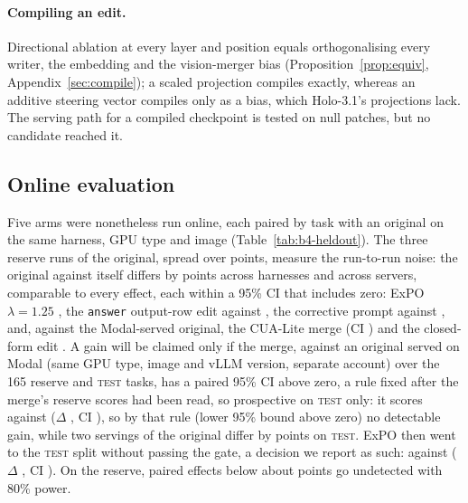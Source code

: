 \paragraph{Compiling an edit.} Directional ablation at every layer and position equals orthogonalising every writer, the embedding and the vision-merger bias (Proposition~\ref{prop:equiv}, Appendix~\ref{sec:compile}); a scaled projection compiles exactly, whereas an additive steering vector compiles only as a bias, which Holo-3.1's projections lack. The serving path for a compiled checkpoint is tested on null patches, but no candidate reached it.

\subsection{Online evaluation}
\label{nsec:online}
Five arms were nonetheless run online, each paired by task with an original on the same harness, GPU type and image (Table~\ref{tab:b4-heldout}). The three reserve runs of the original, spread over \onReserveOrigRange{} points, measure the run-to-run noise: the original against itself differs by \onNoiseDelta{} points across harnesses and \onNoiseServerDelta{} across servers, comparable to every effect, each within a 95\% CI that includes zero: ExPO $\lambda=1.25$ \onReserveExpoDelta, the \texttt{answer} output-row edit \onReserveLmrowArm{} against \onReserveLmrowOrig, the corrective prompt \onReservePromptArm{} against \onReservePromptOrig, and, against the Modal-served original, the CUA-Lite merge \onReserveCuaDelta{} (CI \onReserveCuaCi) and the closed-form edit \onReserveBroadDelta. A gain will be claimed only if the merge, against an original served on Modal (same GPU type, image and vLLM version, separate account) over the 165 reserve and \textsc{test} tasks, has a paired 95\% CI above zero, a rule fixed after the merge's reserve scores had been read, so prospective on \textsc{test} only: it scores \onAllCuaArm{} against \onAllCuaOrig{} ($\Delta$ \onAllCuaDelta, CI \onAllCuaCi), so by that rule (lower 95\% bound above zero) no detectable gain, while two servings of the original differ by \onTestNoiseServerDelta{} points on \textsc{test}. ExPO then went to the \textsc{test} split without passing the gate, a decision we report as such: \onTestExpoArm{} against \onTestExpoOrig{} ($\Delta$ \onTestExpoDelta, CI \onTestExpoCi). On the reserve, paired effects below about \onMde{} points go undetected with 80\% power.


